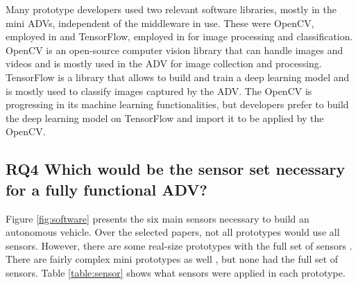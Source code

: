 \documentclass[lettersize,journal]{IEEEtran}
\begin{document}
Many prototype developers used two relevant software libraries, mostly in the mini ADVs, independent of the middleware in use. These were OpenCV, employed in \cite{Jo2015,Kato2015,pannu2015,deac2018,jain2018,Sahu2019,Zhou2019,Sun2019,chaitra2020,valera2019design,pehlivan2020,Sajjad2020,fayjie2018,al2018,Wang2019,Febbo2020} and TensorFlow, employed in \cite{Bechtel2019,do2018,chaitra2020,pehlivan2020,fayjie2018,Wang2019,Febbo2020,valera2019design} for image processing and classification. OpenCV is an open-source computer vision library that can handle images and videos \cite{jain2018} and is mostly used in the ADV for image collection and processing. TensorFlow is a library that allows to build and train a deep learning model \cite{chaitra2020} and is mostly used to classify images captured by the ADV. The OpenCV is progressing in its machine learning functionalities, but developers prefer to build the deep learning model on TensorFlow and import it to be applied by the OpenCV.

\subsection {\textbf{RQ4 Which would be the sensor set necessary for a   fully functional ADV?}}

 Figure \ref{fig:software} presents the six main sensors necessary to build an autonomous vehicle. Over the selected papers, not all prototypes would use all sensors. However, there are some real-size prototypes with the full set of sensors 
\cite{Tas2018a,Belcarz2018,Kessler2019,Betz2019,ORJUELA202015161,9544320,9359043}. There are fairly complex mini prototypes  as well \cite{Percinski2018,fayjie2018,jain2018,Zhou2019,Wang2019,roestam2019,el2020}, but none had the full set of sensors. Table \ref{table:sensor} shows what sensors were applied in each prototype.
\end{document}
